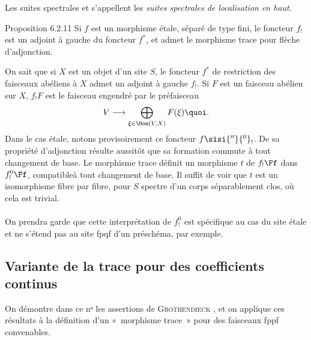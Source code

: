 \documentclass[10pt]{../fichiers-configuration-latex/smfart}
\begin{document}
Les suites spectrales  et  s'appellent les
\emph{suites spectrales de localisation en haut.}

\begin{enonce*}{Proposition 6.2.11}
Si $f$ est un morphisme étale, séparé de type fini, le foncteur
$f_{!}$ est un adjoint à gauche du foncteur $f^{\ast}$, et admet le
morphisme trace pour flèche d'adjonction.
\end{enonce*}

On sait que si $X$ est un objet d'un site $S$, le foncteur $f^{\ast}$
de restriction des faisceaux abéliens à $X$ admet un adjoint à gauche
$f_{!}$. Si $F$ est un faisceau abélien sur $X$, $f_{!}F$ est le
faisceau engendré par le préfaisceau
$$
V\longrightarrow \bigoplus_{\xi \in \Hom(V,X)}F(\xi){\quoi}.
$$
Dans le cas étale, notons provisoirement ce foncteur $f\sisi{''}{^0}_{!}$. De sa
propriété d'adjonction résulte aussitôt que sa formation commute à
tout changement de base. Le morphisme trace définit un morphisme $t$
de $f_{!}\Ff $ dans $f^{0}_{!}\Ff $,
compatible\pageoriginale à tout changement de base. Il suffit de voir
que $t$ est un isomorphisme fibre par fibre, \ie pour $S$ spectre d'un
corps séparablement clos, où cela est trivial.

\setcounter{subsubsection}{11}
\paragraph{}
On prendra garde que cette interprétation de $f^{0}_{!}$ est
spécifique au cas du site étale et ne s'étend pas au site fpqf d'un
préschéma, par exemple.

\subsection{Variante de la trace pour des coefficients continus}

On démontre dans ce nᵒ les assertions de \textsc{Grothendieck}
\cite[nᵒ 6]{SGA4-17:Gr}, et on applique ces résultats à la définition
d'un « morphisme trace » pour des faisceaux fppf convenables.
\end{document}
